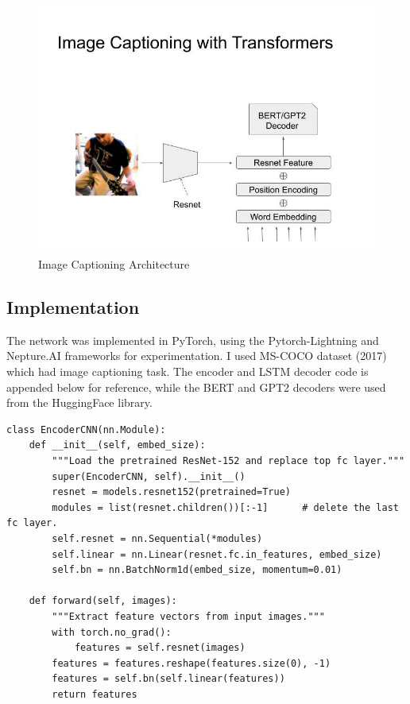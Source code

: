 \documentclass[]{krantz}
\begin{document}
\begin{figure}
\centering
\includegraphics{figures/04-01-use-case1/caption_arch.jpg}
\caption{Image Captioning Architecture}
\end{figure}

\hypertarget{implementation}{%
\subsection{Implementation}\label{implementation}}

The network was implemented in PyTorch, using the Pytorch-Lightning and Nepture.AI frameworks for experimentation. I used MS-COCO dataset (2017) which had image captioning task. The encoder and LSTM decoder code is appended below for reference, while the BERT and GPT2 decoders were used from the HuggingFace library.

\begin{verbatim}
class EncoderCNN(nn.Module):
    def __init__(self, embed_size):
        """Load the pretrained ResNet-152 and replace top fc layer."""
        super(EncoderCNN, self).__init__()
        resnet = models.resnet152(pretrained=True)
        modules = list(resnet.children())[:-1]      # delete the last fc layer.
        self.resnet = nn.Sequential(*modules)
        self.linear = nn.Linear(resnet.fc.in_features, embed_size)
        self.bn = nn.BatchNorm1d(embed_size, momentum=0.01)
        
    def forward(self, images):
        """Extract feature vectors from input images."""
        with torch.no_grad():
            features = self.resnet(images)
        features = features.reshape(features.size(0), -1)
        features = self.bn(self.linear(features))
        return features
\end{verbatim}
\end{document}
